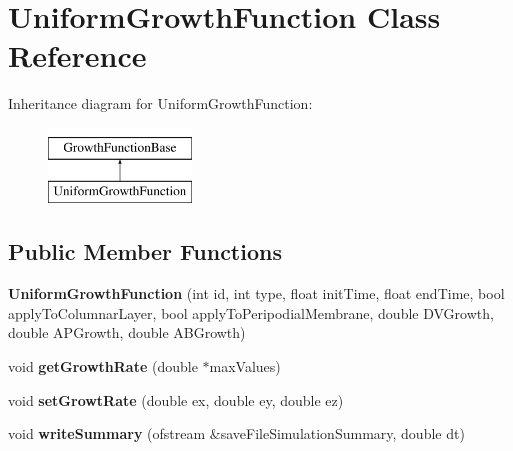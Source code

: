 \hypertarget{classUniformGrowthFunction}{}\section{Uniform\+Growth\+Function Class Reference}
\label{classUniformGrowthFunction}
Inheritance diagram for Uniform\+Growth\+Function\+:\begin{figure}[H]
\begin{center}
\leavevmode
\includegraphics[height=2.000000cm]{classUniformGrowthFunction}
\end{center}
\end{figure}
\subsection*{Public Member Functions}
\begin{DoxyCompactItemize}
\item 
\hypertarget{classUniformGrowthFunction_af74d0e65f1a9486a78871306f99e4eb1}{}{\bfseries Uniform\+Growth\+Function} (int id, int type, float init\+Time, float end\+Time, bool apply\+To\+Columnar\+Layer, bool apply\+To\+Peripodial\+Membrane, double D\+V\+Growth, double A\+P\+Growth, double A\+B\+Growth)\label{classUniformGrowthFunction_af74d0e65f1a9486a78871306f99e4eb1}

\item 
\hypertarget{classUniformGrowthFunction_ad5be18ae004a3eed205ab3570e13202a}{}void {\bfseries get\+Growth\+Rate} (double $\ast$max\+Values)\label{classUniformGrowthFunction_ad5be18ae004a3eed205ab3570e13202a}

\item 
\hypertarget{classUniformGrowthFunction_aff899907569af697d47927f61b6871a5}{}void {\bfseries set\+Growt\+Rate} (double ex, double ey, double ez)\label{classUniformGrowthFunction_aff899907569af697d47927f61b6871a5}

\item 
\hypertarget{classUniformGrowthFunction_a227ffb3a524779628f98f110d3811399}{}void {\bfseries write\+Summary} (ofstream \&save\+File\+Simulation\+Summary, double dt)\label{classUniformGrowthFunction_a227ffb3a524779628f98f110d3811399}

\end{DoxyCompactItemize}
